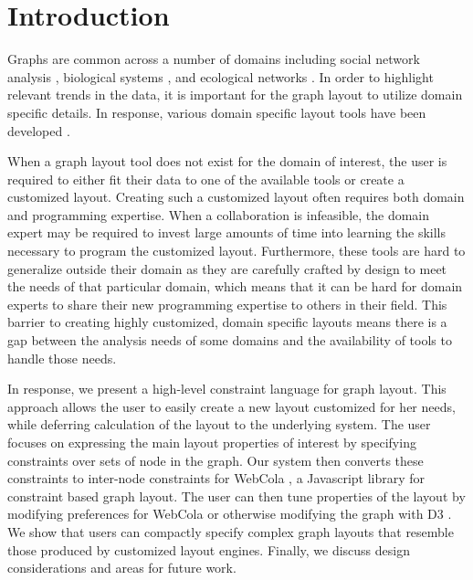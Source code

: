 \section{Introduction}
Graphs are common across a number of domains including social network analysis \cite{scott1988social,travers1967small,granovetter1973strength,watts1998collective,freeman1978centrality}, biological systems \cite{barsky2008cerebral,shannon2003cytoscape,gehlenborg2010visualization,saraiya2005visualizing}, and ecological networks \cite{hinke2004visualizing,harper2006dynamic,lavigne1996cod,baskerville2011spatial,yodzis1998local,cohen2003ecological,kearney2016blog,benson2016higher}. In order to highlight relevant trends in the data, it is important for the graph layout to utilize domain specific details. In response, various domain specific layout tools have been developed \cite{barsky2008cerebral,shannon2003cytoscape,kearney2017d3,kearney2017ecopath,gawron2016pss}.

When a graph layout tool does not exist for the domain of interest, the user is required to either fit their data to one of the available tools or create a customized layout. Creating such a customized layout often requires both domain and programming expertise. When a collaboration is infeasible, the domain expert may be required to invest large amounts of time into learning the skills necessary to program the customized layout. Furthermore, these tools are hard to generalize outside their domain as they are carefully crafted by design to meet the needs of that particular domain, which means that it can be hard for domain experts to share their new programming expertise to others in their field. This barrier to creating highly customized, domain specific layouts means there is a gap between the analysis needs of some domains and the availability of tools to handle those needs.

In response, we present a high-level constraint language for graph layout. This approach allows the user to easily create a new layout customized for her needs, while deferring calculation of the layout to the underlying system. The user focuses on expressing the main layout properties of interest by specifying constraints over sets of node in the graph. Our system then converts these constraints to inter-node constraints for WebCola \cite{WebCoLa}, a Javascript library for constraint based graph layout. The user can then tune properties of the layout by modifying preferences for WebCola or otherwise modifying the graph with D3 \cite{bostock:d3}. We show that users can compactly specify complex graph layouts that resemble those produced by customized layout engines. Finally, we discuss design considerations and areas for future work.



%  
